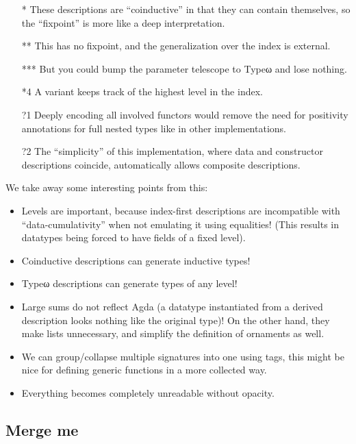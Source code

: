 \documentclass[10pt]{article}
\theoremstyle{plain}
\theoremstyle{definition}
\begin{document}
\begin{itemize}
    \item[*] These descriptions are ``coinductive'' in that they can contain themselves, so the ``fixpoint'' is more like a deep interpretation.
    \item[**] This has no fixpoint, and the generalization over the index is external.
    \item[***] But you could bump the parameter telescope to Typeω and lose nothing.
    \item[*4] A variant keeps track of the highest level in the index.
    \item[?1] Deeply encoding all involved functors would remove the need for positivity annotations for full nested types like in other implementations.
    \item[?2] The ``simplicity'' of this implementation, where data and constructor descriptions coincide, automatically allows composite descriptions.
\end{itemize}

We take away some interesting points from this:
\begin{itemize}
    \item Levels are important, because index-first descriptions are incompatible with ``data-cumulativity'' when not emulating it using equalities! (This results in datatypes being forced to have fields of a fixed level).
    \item Coinductive descriptions can generate inductive types!
    \item Typeω descriptions can generate types of any level!
    \item Large sums do not reflect Agda (a datatype instantiated from a derived description looks nothing like the original type)! On the other hand, they make lists unnecessary, and simplify the definition of ornaments as well.
    \item We can group/collapse multiple signatures into one using tags, this might be nice for defining generic functions in a more collected way.
    \item Everything becomes completely unreadable without opacity.
\end{itemize}

\subsection{Merge me}
\end{document}
